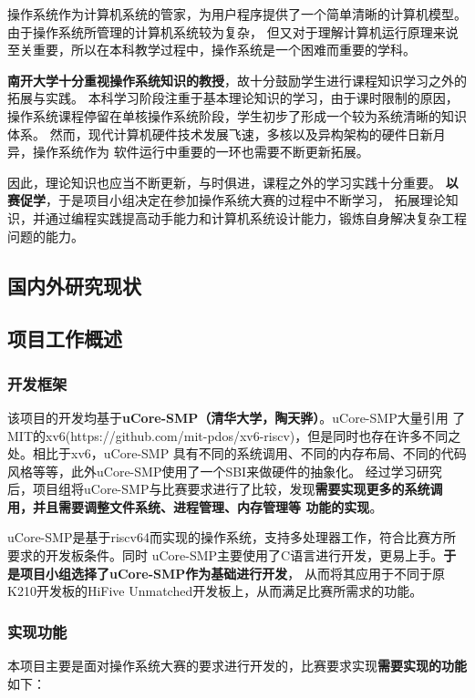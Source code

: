 \documentclass[UTF8,a4paper,10pt]{ctexart}
\begin{document}
操作系统作为计算机系统的管家，为用户程序提供了一个简单清晰的计算机模型。由于操作系统所管理的计算机系统较为复杂，
但又对于理解计算机运行原理来说至关重要，所以在本科教学过程中，操作系统是一个困难而重要的学科。

\textbf{南开大学十分重视操作系统知识的教授}，故十分鼓励学生进行课程知识学习之外的拓展与实践。
本科学习阶段注重于基本理论知识的学习，由于课时限制的原因，
操作系统课程停留在单核操作系统阶段，学生初步了形成一个较为系统清晰的知识体系。
然而，现代计算机硬件技术发展飞速，多核以及异构架构的硬件日新月异，操作系统作为
软件运行中重要的一环也需要不断更新拓展。

因此，理论知识也应当不断更新，与时俱进，课程之外的学习实践十分重要。
\textbf{以赛促学}，于是项目小组决定在参加操作系统大赛的过程中不断学习，
拓展理论知识，并通过编程实践提高动手能力和计算机系统设计能力，锻炼自身解决复杂工程问题的能力。


\subsection{国内外研究现状}

\subsection{项目工作概述}

\subsubsection{开发框架}

该项目的开发均基于\textbf{uCore-SMP（清华大学，陶天骅）}。uCore-SMP大量引用
了MIT的xv6(https://github.com/mit-pdos/xv6-riscv)，但是同时也存在许多不同之处。相比于xv6，uCore-SMP
具有不同的系统调用、不同的内存布局、不同的代码风格等等，此外uCore-SMP使用了一个SBI来做硬件的抽象化。
经过学习研究后，项目组将uCore-SMP与比赛要求进行了比较，发现\textbf{需要实现更多的系统调用，并且需要调整文件系统、进程管理、内存管理等
功能的实现}。

uCore-SMP是基于riscv64而实现的操作系统，支持多处理器工作，符合比赛方所要求的开发板条件。同时
uCore-SMP主要使用了C语言进行开发，更易上手。\textbf{于是项目小组选择了uCore-SMP作为基础进行开发}，
从而将其应用于不同于原K210开发板的HiFive Unmatched开发板上，从而满足比赛所需求的功能。
\subsubsection{实现功能}

本项目主要是面对操作系统大赛的要求进行开发的，比赛要求实现\textbf{需要实现的功能}如下：
\end{document}
